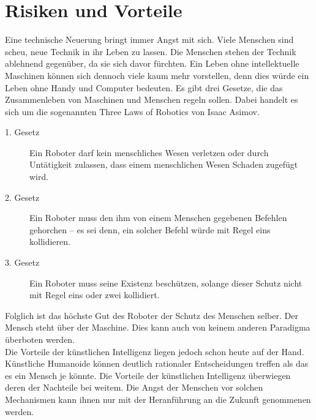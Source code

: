 \section{Risiken und Vorteile}
Eine technische Neuerung bringt immer Angst mit sich. Viele Menschen sind scheu, neue Technik in ihr Leben zu lassen. Die Menschen stehen der Technik ablehnend gegenüber, da sie sich davor fürchten. Ein Leben ohne intellektuelle Maschinen können sich dennoch viele kaum mehr vorstellen, denn dies würde ein Leben ohne Handy und Computer bedeuten. Es gibt drei Gesetze, die das Zusammenleben von Maschinen und Menschen regeln sollen. Dabei handelt es sich um die sogenannten \dq  Three Laws of Robotics \dq von Isaac Asimov.
\begin{description}
	\item [1. Gesetz] Ein Roboter darf kein menschliches Wesen verletzen oder durch Untätigkeit zulassen, dass einem menschlichen Wesen Schaden zugefügt wird.
	\item [2. Gesetz]Ein Roboter muss den ihm von einem Menschen gegebenen Befehlen gehorchen – es sei denn, ein solcher Befehl würde mit Regel eins kollidieren.
	\item [3. Gesetz]Ein Roboter muss seine Existenz beschützen, solange dieser Schutz nicht mit Regel eins oder zwei kollidiert.
\end{description}
Folglich ist das höchste Gut des Roboter der Schutz des Menschen selber. Der Mensch steht über der Maschine. Dies kann auch von keinem anderen Paradigma überboten werden. \\
Die Vorteile der künstlichen Intelligenz liegen jedoch schon heute auf der Hand. Künstliche Humanoide können deutlich rationaler Entscheidungen treffen als das es ein Mensch je könnte. Die Vorteile der künstlichen Intelligenz überwiegen deren der Nachteile bei weitem. Die Angst der Menschen vor solchen Mechanismen kann ihnen nur mit der Heranführung an die Zukunft genommenen werden.

